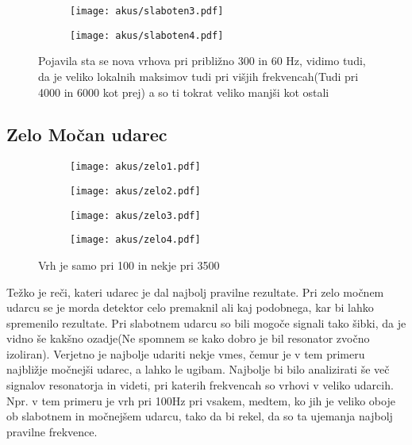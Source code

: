 \documentclass{article}
\begin{document}
\begin{figure}[H]
\begin{subfigure}{.5\textwidth}
\texttt{[image: akus/slaboten3.pdf]}
\end{subfigure}
\begin{subfigure}{.5\textwidth}
\texttt{[image: akus/slaboten4.pdf]}
\end{subfigure}
\caption*{Pojavila sta se nova vrhova pri približno 300 in 60 Hz, vidimo tudi, da je veliko lokalnih maksimov tudi pri višjih frekvencah(Tudi pri 4000 in 6000 kot prej) a so ti tokrat veliko manjši kot ostali}
\end{figure}

\subsection{Zelo Močan udarec}
\begin{figure}[H]
\begin{subfigure}{.5\textwidth}
\texttt{[image: akus/zelo1.pdf]}
\end{subfigure}
\begin{subfigure}{.5\textwidth}
\texttt{[image: akus/zelo2.pdf]}
\end{subfigure}
\end{figure}
\begin{figure}[H]
\begin{subfigure}{.5\textwidth}
\texttt{[image: akus/zelo3.pdf]}
\end{subfigure}
\begin{subfigure}{.5\textwidth}
\texttt{[image: akus/zelo4.pdf]}
\end{subfigure}
\caption*{Vrh je samo pri 100 in nekje pri 3500}
\end{figure}

Težko je reči, kateri udarec je dal najbolj pravilne rezultate. Pri zelo močnem udarcu se je morda detektor celo premaknil ali kaj podobnega, kar bi lahko spremenilo rezultate. Pri slabotnem udarcu so bili mogoče signali tako šibki, da je vidno še kakšno ozadje(Ne spomnem se kako dobro je bil resonator zvočno izoliran). 
Verjetno je najbolje udariti nekje vmes, čemur je v tem primeru najbližje močnejši udarec, a lahko le ugibam. Najbolje bi bilo analizirati še več signalov resonatorja in videti, pri katerih frekvencah so vrhovi v veliko udarcih. Npr. v tem primeru je vrh pri 100Hz pri vsakem, medtem, ko jih je veliko oboje ob slabotnem in močnejšem udarcu, tako da bi rekel, da so ta ujemanja najbolj pravilne frekvence.
\end{document}
